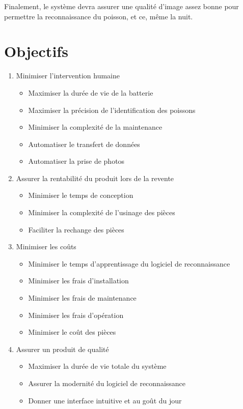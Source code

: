 Finalement, le système devra assurer une qualité d'image assez bonne pour permettre la reconnaissance du poisson, et ce, même la nuit.

\section{Objectifs}

\begin{enumerate}
    \item Minimiser l'intervention humaine
    \begin{itemize}
        \item Maximiser la durée de vie de la batterie
        \item Maximiser la précision de l'identification des poissons
        \item Minimiser la complexité de la maintenance
        \item Automatiser le transfert de données
        \item Automatiser la prise de photos
    \end{itemize}
    
    \item Assurer la rentabilité du produit lors de la revente
    \begin{itemize}
        \item Minimiser le temps de conception
        \item Minimiser la complexité de l'usinage des pièces
        \item Faciliter la rechange des pièces
    \end{itemize}
    
    \item Minimiser les coûts
    \begin{itemize}
        \item Minimiser le temps d'apprentissage du logiciel de reconnaissance
        \item Minimiser les frais d'installation
        \item Minimiser les frais de maintenance
        \item Minimiser les frais d'opération
        \item Minimiser le coût des pièces
    \end{itemize}
    
    \item Assurer un produit de qualité
    \begin{itemize}
        \item Maximiser la durée de vie totale du système
        \item Assurer la modernité du logiciel de reconnaissance
        \item Donner une interface intuitive et au goût du jour
    \end{itemize}
    

\end{enumerate}
